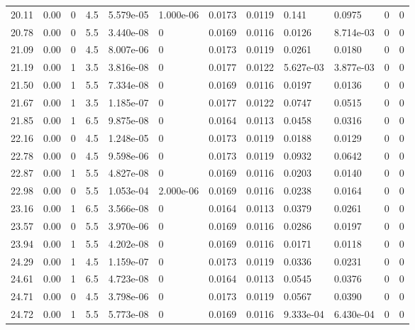 \documentclass[preview]{standalone}
\begin{document}
{{{\begin{tabular}{L{1.2cm}C{1.2cm} C{0.3cm}C{0.5cm} C{1.4cm}C{1.4cm} C{1.4cm}C{1.4cm} C{1.6cm}C{1.6cm} C{1.6cm}C{1.6cm}}
  20.11  &  0.00  & 0     & 4.5 &  5.579e-05  & 1.000e-06  &  0.0173&   0.0119& 0.141 & 0.0975   &  0 & 0  \\ 
  20.78  &  0.00  & 0     & 5.5 &  3.440e-08  & 0  &  0.0169&   0.0116& 0.0126 & 8.714e-03   &  0 & 0  \\ 
  21.09  &  0.00  & 0     & 4.5 &  8.007e-06  & 0  &  0.0173&   0.0119& 0.0261 & 0.0180   &  0 & 0  \\ 
  21.19  &  0.00  & 1     & 3.5 &  3.816e-08  & 0  &  0.0177&   0.0122& 5.627e-03 & 3.877e-03   &  0 & 0  \\ 
  21.50  &  0.00  & 1     & 5.5 &  7.334e-08  & 0  &  0.0169&   0.0116& 0.0197 & 0.0136   &  0 & 0  \\ 
  21.67  &  0.00  & 1     & 3.5 &  1.185e-07  & 0  &  0.0177&   0.0122& 0.0747 & 0.0515   &  0 & 0  \\ 
  21.85  &  0.00  & 1     & 6.5 &  9.875e-08  & 0  &  0.0164&   0.0113& 0.0458 & 0.0316   &  0 & 0  \\ 
  22.16  &  0.00  & 0     & 4.5 &  1.248e-05  & 0  &  0.0173&   0.0119& 0.0188 & 0.0129   &  0 & 0  \\ 
  22.78  &  0.00  & 0     & 4.5 &  9.598e-06  & 0  &  0.0173&   0.0119& 0.0932 & 0.0642   &  0 & 0  \\ 
  22.87  &  0.00  & 1     & 5.5 &  4.827e-08  & 0  &  0.0169&   0.0116& 0.0203 & 0.0140   &  0 & 0  \\ 
  22.98  &  0.00  & 0     & 5.5 &  1.053e-04  & 2.000e-06  &  0.0169&   0.0116& 0.0238 & 0.0164   &  0 & 0  \\ 
  23.16  &  0.00  & 1     & 6.5 &  3.566e-08  & 0  &  0.0164&   0.0113& 0.0379 & 0.0261   &  0 & 0  \\ 
  23.57  &  0.00  & 0     & 5.5 &  3.970e-06  & 0  &  0.0169&   0.0116& 0.0286 & 0.0197   &  0 & 0  \\ 
  23.94  &  0.00  & 1     & 5.5 &  4.202e-08  & 0  &  0.0169&   0.0116& 0.0171 & 0.0118   &  0 & 0  \\ 
  24.29  &  0.00  & 1     & 4.5 &  1.159e-07  & 0  &  0.0173&   0.0119& 0.0336 & 0.0231   &  0 & 0  \\ 
  24.61  &  0.00  & 1     & 6.5 &  4.723e-08  & 0  &  0.0164&   0.0113& 0.0545 & 0.0376   &  0 & 0  \\ 
  24.71  &  0.00  & 0     & 4.5 &  3.798e-06  & 0  &  0.0173&   0.0119& 0.0567 & 0.0390   &  0 & 0  \\ 
  24.72  &  0.00  & 1     & 5.5 &  5.773e-08  & 0  &  0.0169&   0.0116& 9.333e-04 & 6.430e-04   &  0 & 0  \\ 

\end{tabular}}}}
\end{document}
